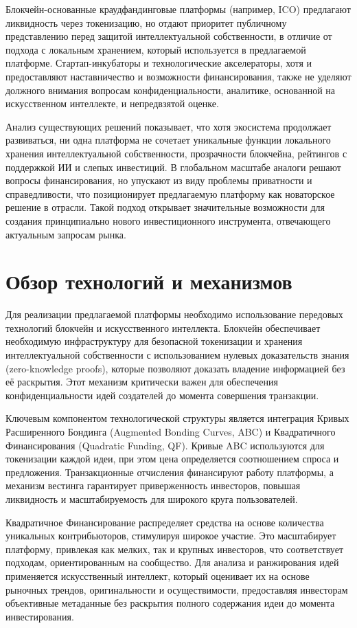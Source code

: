 \documentclass[
    candidate, %
    subf, %
]{disser}
\begin{document}
Блокчейн-основанные краудфандинговые платформы (например, ICO) предлагают ликвидность через токенизацию, но отдают приоритет публичному представлению перед защитой интеллектуальной собственности, в отличие от подхода с локальным хранением, который используется в предлагаемой платформе. Стартап-инкубаторы и технологические акселераторы, хотя и предоставляют наставничество и возможности финансирования, также не уделяют должного внимания вопросам конфиденциальности, аналитике, основанной на искусственном интеллекте, и непредвзятой оценке.

Анализ существующих решений показывает, что хотя экосистема продолжает развиваться, ни одна платформа не сочетает уникальные функции локального хранения интеллектуальной собственности, прозрачности блокчейна, рейтингов с поддержкой ИИ и слепых инвестиций. В глобальном масштабе аналоги решают вопросы финансирования, но упускают из виду проблемы приватности и справедливости, что позиционирует предлагаемую платформу как новаторское решение в отрасли. Такой подход открывает значительные возможности для создания принципиально нового инвестиционного инструмента, отвечающего актуальным запросам рынка.

\section{Обзор технологий и механизмов}

Для реализации предлагаемой платформы необходимо использование передовых технологий блокчейн и искусственного интеллекта. Блокчейн обеспечивает необходимую инфраструктуру для безопасной токенизации и хранения интеллектуальной собственности с использованием нулевых доказательств знания (zero-knowledge proofs), которые позволяют доказать владение информацией без её раскрытия. Этот механизм критически важен для обеспечения конфиденциальности идей создателей до момента совершения транзакции.

Ключевым компонентом технологической структуры является интеграция Кривых Расширенного Бондинга (Augmented Bonding Curves, ABC) и Квадратичного Финансирования (Quadratic Funding, QF). Кривые ABC используются для токенизации каждой идеи, при этом цена определяется соотношением спроса и предложения. Транзакционные отчисления финансируют работу платформы, а механизм вестинга гарантирует приверженность инвесторов, повышая ликвидность и масштабируемость для широкого круга пользователей.

Квадратичное Финансирование распределяет средства на основе количества уникальных контрибьюторов, стимулируя широкое участие. Это масштабирует платформу, привлекая как мелких, так и крупных инвесторов, что соответствует подходам, ориентированным на сообщество. Для анализа и ранжирования идей применяется искусственный интеллект, который оценивает их на основе рыночных трендов, оригинальности и осуществимости, предоставляя инвесторам объективные метаданные без раскрытия полного содержания идеи до момента инвестирования.
\end{document}
